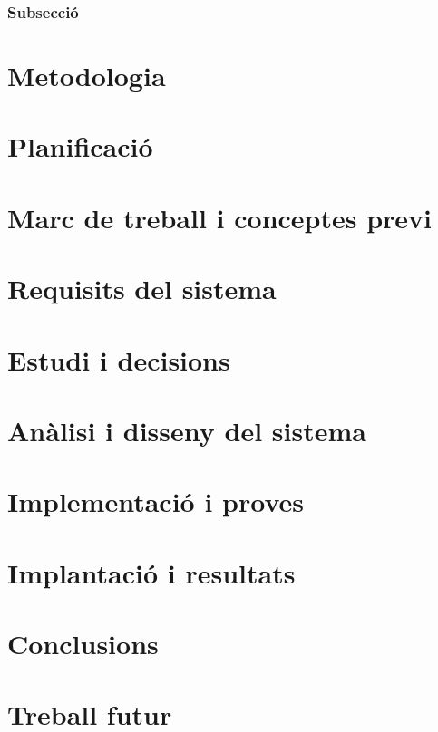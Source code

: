 \documentclass[a4paper,12pt,twoside]{ThesisStyle}
\begin{document}
\subsection{Subsecció}

\chapter{Metodologia}
\label{cap:metodologia}

\chapter{Planificació}
\label{cap:planificació}

\chapter{Marc de treball i conceptes previ}
\label{cap:marcdetreball}

\chapter{Requisits del sistema}
\label{cap:requisits}

\chapter{Estudi i decisions}
\label{cap:estudi}

\chapter{Anàlisi i disseny del sistema}
\label{cap:analisi}

\chapter{Implementació i proves}
\label{cap:implementacio}

\chapter{Implantació i resultats}
\label{cap:implantacio}

\chapter{Conclusions}
\label{cap:conclusions}

\chapter{Treball futur}
\label{cap:treballfutur}



\backmatter


%




\end{document}
